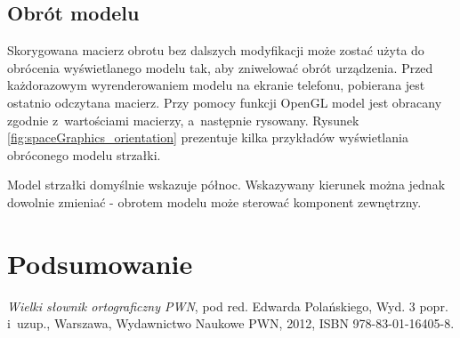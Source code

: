 \documentclass[a4paper,twocolumn,11pt]{article}
\begin{document}
\subsection{Obrót modelu}
 Skorygowana macierz obrotu bez dalszych modyfikacji może zostać użyta do obrócenia wyświetlanego modelu tak, aby zniwelować obrót urządzenia.
 Przed każdorazowym wyrenderowaniem modelu na ekranie telefonu, pobierana jest ostatnio odczytana macierz.
 Przy pomocy funkcji OpenGL model jest obracany zgodnie z~wartościami macierzy, a~następnie rysowany.
 Rysunek \ref{fig:spaceGraphics_orientation} prezentuje kilka przykładów wyświetlania obróconego modelu strzałki.
 
 
 
 Model strzałki domyślnie wskazuje północ.
 Wskazywany kierunek można jednak dowolnie zmieniać - obrotem modelu może sterować komponent zewnętrzny.



\section{Podsumowanie}



\begin{thebibliography}{9}
 \small
 
  \emph{Wielki słownik ortograficzny PWN},
  pod red. Edwarda Polańskiego,
  Wyd. 3 popr. i~uzup.,
  Warszawa,
  Wydawnictwo Naukowe PWN,
  2012,
  ISBN 978-83-01-16405-8.

\end{thebibliography}
\end{document}
